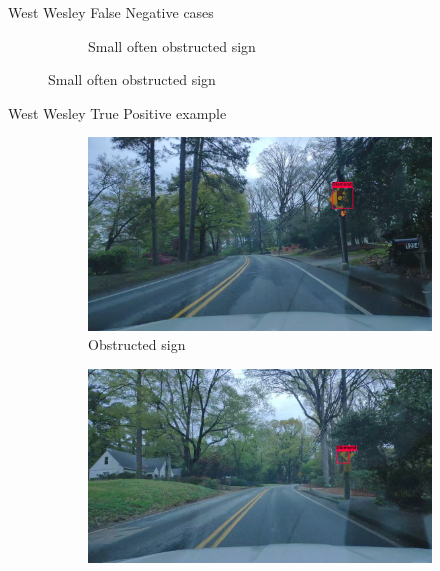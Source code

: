 \documentclass{beamer}
\begin{document}
\begin{frame}{West Wesley False Negative cases}
\begin{figure}
\begin{center}
\begin{subfigure}[t]{.49\linewidth}
         \caption{Small often obstructed sign}
          \label{fig:wwobsFN}
        \end{subfigure}
        \label{fig:wwFNcases}
      \end{center}
    \end{figure}
\end{frame}{}

\begin{frame}{West Wesley True Positive example}
    \begin{figure}
      \begin{center}
        \begin{subfigure}[t]{.49\linewidth}
          \centering
          \includegraphics[width=0.99\linewidth]{figures/examples/westwestley/TP/TP04.jpg}
          \caption{Obstructed sign}
          \label{fig:wwObs1TP}
        \end{subfigure}
        \begin{subfigure}[t]{.49\linewidth}
          \centering
          \includegraphics[width=0.99\linewidth]{figures/examples/westwestley/TP/TP02.jpg}

\end{subfigure}
\end{center}
\end{figure}
\end{frame}
\end{document}
